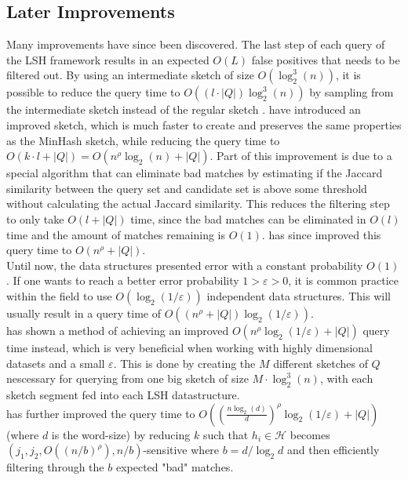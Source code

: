 \subsection{Later Improvements}
Many improvements have since been discovered. The last step of each query of the LSH framework results in an expected $O(L)$ false positives that needs to be filtered out. By using an intermediate sketch of size $O(\log_2^3(n))$, it is possible to reduce the query time to $O((l\cdot |Q|)\log_2^3(n))$ by sampling from the intermediate sketch instead of the regular sketch \cite{dahlgaard2017fast}.
\citet{dahlgaard2017fast} have introduced an improved sketch, which is much faster to create and preserves the same properties as the MinHash sketch, while reducing the query time to $O(k\cdot l + |Q|)=O(n^\rho \log_2(n) + |Q|)$. Part of this improvement is due to a special algorithm that can eliminate bad matches by estimating if the Jaccard similarity between the query set and candidate set is above some threshold without calculating the actual Jaccard similarity. This reduces the filtering step to only take $O(l + |Q|)$ time, since the bad matches can be eliminated in $O(l)$ time and the amount of matches remaining is $O(1)$. \citet{christiani2018fast} has since improved this query time to $O(n^\rho + |Q|)$. \\
Until now, the data structures presented error with a constant probability $O(1)$. If one wants to reach a better error probability $1>\varepsilon>0$, it is common practice within the field to use $O(\log_2(1/\varepsilon))$ independent data structures. This will usually result in a query time of $O((n^\rho + |Q|)\log_2(1/\varepsilon))$. \\
\citet{fast-similarity-search} has shown a method of achieving an improved $O(n^\rho \log_2(1/\varepsilon)+|Q|)$ query time instead, which is very beneficial when working with highly dimensional datasets and a small $\varepsilon$. This is done by creating the $M$ different sketches of $Q$ nescessary for querying from one big sketch of size $M\cdot \log^3_2(n)$, with each sketch segment fed into each LSH datastructure.\\
\citet{fast-similarity-search} has further improved the query time to $O((\frac{n\log_2(d)}{d})^{\rho}\log_2(1/\varepsilon)+|Q|)$ (where $d$ is the word-size) by reducing $k$ such that $h_i\in \mathcal{H}$ becomes $(j_1, j_2, O((n/b)^\rho), n/b)$-sensitive where $b=d/\log_2d$ and then efficiently filtering through the $b$ expected "bad" matches. \\
